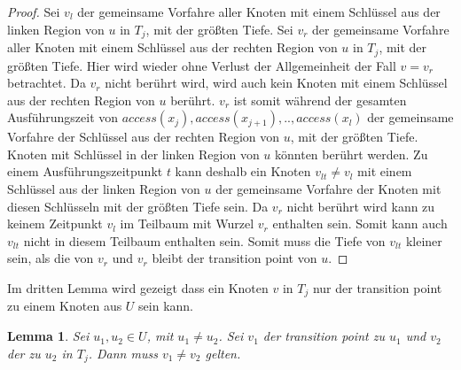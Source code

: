 \documentclass[a4paper,12pt]{article}
\newtheorem{Lemma}{Lemma}[section]
\begin{document}
\begin{proof}
	Sei $v_l$ der gemeinsame Vorfahre aller Knoten mit einem Schlüssel aus der linken Region von $u$ in $T_j$, mit der größten Tiefe. Sei $v_r$ der gemeinsame Vorfahre aller Knoten mit einem Schlüssel aus der rechten Region von $u$ in $T_j$, mit der größten Tiefe. Hier wird wieder ohne Verlust der Allgemeinheit der Fall $v = v_r$ betrachtet. Da $v_r$ nicht berührt wird, wird auch kein Knoten mit einem Schlüssel aus der rechten Region von $u$ berührt. $v_r$ ist somit während der gesamten Ausführungszeit von $\textit{access}\left(x_j\right),\textit{access}\left(x_{j+1}\right),..,\textit{access}\left(x_l\right)$  der gemeinsame Vorfahre der Schlüssel aus der rechten Region von $u$, mit der größten Tiefe. Knoten mit Schlüssel in der linken Region von $u$ könnten berührt werden. Zu einem Ausführungszeitpunkt $t$ kann deshalb ein Knoten $v_{lt} \ne v_l$ mit einem Schlüssel aus der linken Region von $u$ der gemeinsame Vorfahre der Knoten mit diesen Schlüsseln mit der größten Tiefe sein. Da $v_r$ nicht berührt wird kann zu keinem Zeitpunkt $v_l$ im Teilbaum mit Wurzel $v_r$ enthalten sein. Somit kann auch $v_{lt}$ nicht in diesem Teilbaum enthalten sein. Somit muss die Tiefe von  $v_{lt}$ kleiner sein, als die von $v_r$ und $v_r$ bleibt der transition point von $u$. 
\end{proof}

\noindent Im dritten Lemma wird gezeigt dass ein Knoten $v$ in $T_j$ nur der transition point zu einem Knoten aus $U$ sein kann.


\begin{Lemma}\label{lemmaDemaine3}
	Sei $u_1, u_2 \in U$, mit $u_1 \ne u_2$.  Sei $v_1$ der transition point zu $u_1$ und $v_2$ der zu $u_2$ in $T_j$. Dann muss $v_1 \neq v_2$ gelten.
\end{Lemma}
\end{document}

